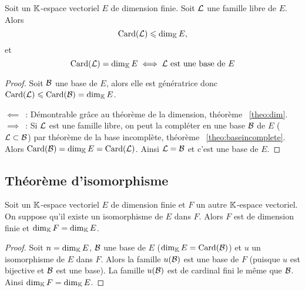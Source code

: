 \begin{theo}
  Soit un \(\mathbb{K}\)-espace vectoriel \(E\) de dimension finie. Soit \(\mathcal{L}\) une 
  famille libre de \(E\). Alors
  \begin{equation}
    \operatorname{Card}(\mathcal{L}) \leqslant \operatorname{dim}_{\mathbb{K}} E,
  \end{equation}
  et
  \begin{equation}
    \operatorname{Card}(\mathcal{L})=\operatorname{dim}_{\mathbb{K}} E \iff \mathcal{L} \text{~est une base de } E
  \end{equation}
\end{theo}
\begin{proof}
  Soit \(\mathcal{B}\) une base de \(E\), alors elle est génératrice donc \(\operatorname{Card}(\mathcal{L}) 
  \leqslant \operatorname{Card}(\mathcal{B})=\operatorname{dim}_{\mathbb{K}} E\).

  \(\impliedby\)~: Démontrable grâce au théorème de la dimension, théorème~
  \ref{theo:dim}.  \(\implies\)~: Si \(\mathcal{L}\) est une famille libre, on peut la 
  compléter en une base \(\mathcal{B}\) de \(E\) (\(\mathcal{L} \subset \mathcal{B}\)) par théorème de la 
  base incomplète, théorème~
  \ref{theo:baseincomplete}. Alors \(\operatorname{Card}(\mathcal{B})=\operatorname{dim}_{\mathbb{K}} E = \operatorname{Card}(\mathcal{L})\). Ainsi 
  \(\mathcal{L}=\mathcal{B}\) et c'est une base de \(E\).
\end{proof}

\subsection{Théorème d'isomorphisme}

\begin{prop}
  Soit un \(\mathbb{K}\)-espace vectoriel \(E\) de dimension finie et \(F\) un autre 
  \(\mathbb{K}\)-espace vectoriel. On suppose qu'il existe un isomorphisme de \(E\) dans 
  \(F\). Alors \(F\) est de dimension finie et \(\operatorname{dim}_{\mathbb{K}} F = \operatorname{dim}_{\mathbb{K}} E\).
\end{prop}
\begin{proof}
  Soit \(n = \operatorname{dim}_{\mathbb{K}} E\), \(\mathcal{B}\) une base de \(E\) (\(\operatorname{dim}_{\mathbb{K}} E = \operatorname{Card}(\mathcal{B})\)) 
  et \(u\) un isomorphisme de \(E\) dans \(F\). Alors la famille \(u(\mathcal{B})\) est 
  une base de \(F\) (puisque \(u\) est bijective et \(\mathcal{B}\) est une base). La 
  famille \(u(\mathcal{B})\) est de cardinal fini le même que \(\mathcal{B}\). Ainsi \(\operatorname{dim}_{\mathbb{K}} F = 
  \operatorname{dim}_{\mathbb{K}} E\).
\end{proof}

